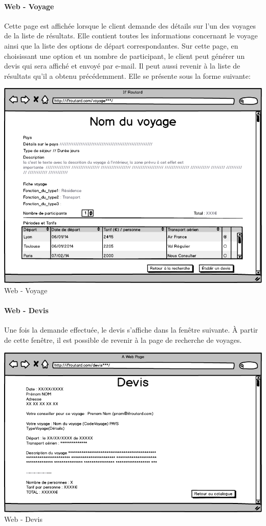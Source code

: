 \documentclass[11pt]{article}
\begin{document}
\paragraph{Web - Voyage}
Cette page est affichée lorsque le client demande des détails sur l'un des voyages de la liste de résultats. Elle contient toutes les informations concernant le voyage ainsi que la liste des options de départ correspondantes. Sur cette page, en choisissant une option et un nombre de participant, le client peut générer un devis qui sera affiché et envoyé par e-mail. Il peut aussi revenir à la liste de résultats qu'il a obtenu précédemment. Elle se présente sous la forme suivante:
\begin{center}
\includegraphics[scale = 0.4]{../Conception_graphique/png_Pour_CR/Web-40-Voyage.png}
\newline
Web - Voyage
\label{fig:Voyage}
\end{center}

\paragraph{Web - Devis}
Une fois la demande effectuée, le devis s'affiche dans la fenêtre suivante. À partir de cette fenêtre, il est possible de revenir à la page de recherche de voyages.
\begin{center}
\includegraphics[scale = 0.4]{../Conception_graphique/png_Pour_CR/Web-50-Devis.png}
\newline
Web - Devis
\label{fig:Devis}
\end{center} 
\end{document}
